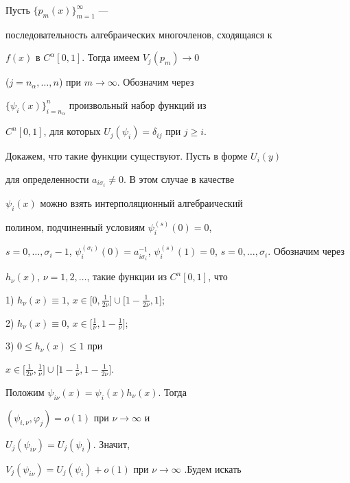 \begin{pf}


Пусть $\{p_m(x)\}_{m=1}^\infty$ ---


последовательность алгебраических многочленов, сходящаяся к


$f(x)$ в $C^\alpha[0,1]$. Тогда имеем $V_j(p_m)\to 0$


($j=n_\alpha,\dotsc,n$) при $m\to\infty$. Обозначим через


$\{\psi_i(x)\}_{i=n_\alpha}^n$ произвольный набор функций из


$C^n[0,1]$, для которых $U_j(\psi_i)=\delta_{ij}$ при $j\ge i$.


Докажем, что такие функции существуют. Пусть в форме $U_i(y)$


для определенности $a_{i\sigma_i}{\ne}0$. В этом случае в качестве


$\psi_i(x)$ можно взять интерполяционный алгебраический


полином, подчиненный условиям $\psi_i^{(s)}(0)=0$,


$s=0,\dotsc,\sigma_i-1$, $\psi_i^{(\sigma_i)}(0)=a_{i\sigma_i}^{-


1}$, $\psi_i^{(s)}(1)=0$, $s=0,\dotsc,\sigma_i$. Обозначим через


$h_\nu(x)$, $\nu=1,2,\dotsc$, такие функции из $C^n[0,1]$, что





1) $h_\nu(x)\equiv 1$, $x\in\big[0, \frac1{2\nu}\big]\cup\big[1-


\frac1{2\nu},1\big]$;





2) $h_\nu(x)\equiv 0$, $x\in\big[ \frac1{\nu},1- \frac1{\nu}\big]$;





3) $0\le h_\nu(x)\le 1$ при


$x\in\big[ \frac1{2\nu}, \frac1{\nu}\big]\cup\big[1- \frac1\nu,1-


\frac1{2\nu}\big]$.





Положим $\psi_{i\nu}(x)=\psi_i(x)h_\nu(x)$. Тогда


$(\psi_{i,\nu},\varphi_j)=o(1)$ при $\nu\to\infty$ и


$U_j(\psi_{i\nu})=U_j(\psi_i)$. Значит,


$V_j(\psi_{i\nu})=U_j(\psi_i)+o(1)$ при $\nu\to\infty$ .Будем искать



\end{pf}
